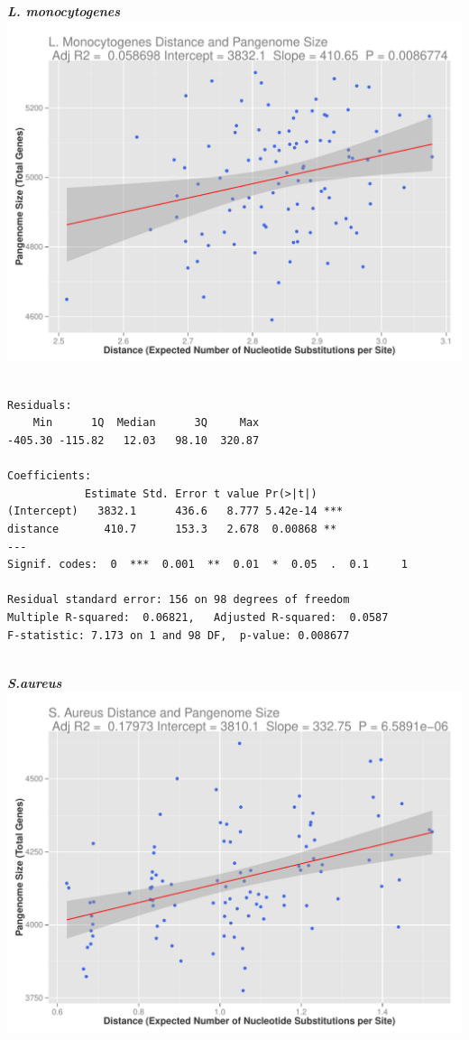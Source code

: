 \documentclass[12pt]{article}
\begin{document}
\newpage

{\large \textbf{\textit{L. monocytogenes}}\\}
\includegraphics[width=\textwidth]{lmonoplotlr.pdf}

\begin{lstlisting}

Residuals:
    Min      1Q  Median      3Q     Max 
-405.30 -115.82   12.03   98.10  320.87 

Coefficients:
            Estimate Std. Error t value Pr(>|t|)    
(Intercept)   3832.1      436.6   8.777 5.42e-14 ***
distance       410.7      153.3   2.678  0.00868 ** 
---
Signif. codes:  0  ***  0.001  **  0.01  *  0.05  .  0.1     1

Residual standard error: 156 on 98 degrees of freedom
Multiple R-squared:  0.06821,   Adjusted R-squared:  0.0587 
F-statistic: 7.173 on 1 and 98 DF,  p-value: 0.008677


\end{lstlisting} 

\newpage

{\large \textbf{\textit{S.aureus}}\\}
\includegraphics[width=\textwidth]{saureusplotlr.pdf}
\end{document}
